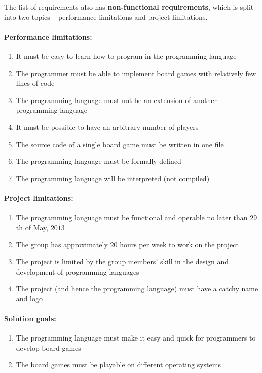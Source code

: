 The list of requirements also has \textbf{non-functional requirements}, which is
split into two topics -- performance limitations and project limitations.

\paragraph*{Performance limitations:}
\begin{enumerate}
  \item It must be easy to learn how to program in the programming language
  \item The programmer must be able to implement board games with relatively few
    lines of code
  \item The programming language must not be an extension of another programming
    language
  \item It must be possible to have an arbitrary number of players
  \item The source code of a single board game must be written in one file
  \item The programming language must be formally defined
  \item The programming language will be interpreted (not compiled)
\end{enumerate}

\paragraph*{Project limitations:}
\begin{enumerate}
  \item The programming language must be functional and operable no later than
    $29$th of May, $2013$
  \item The group has approximately $20$ hours per week to work on the project
  \item The project is limited by the group members' skill in the design and
    development of programming languages
  \item The project (and hence the programming language) must have a catchy name
    and logo
\end{enumerate}

\paragraph*{Solution goals:}
\begin{enumerate}
  \item The programming language must make it easy and quick for programmers to
    develop board games
  \item The board games must be playable on different operating systems
\end{enumerate}


